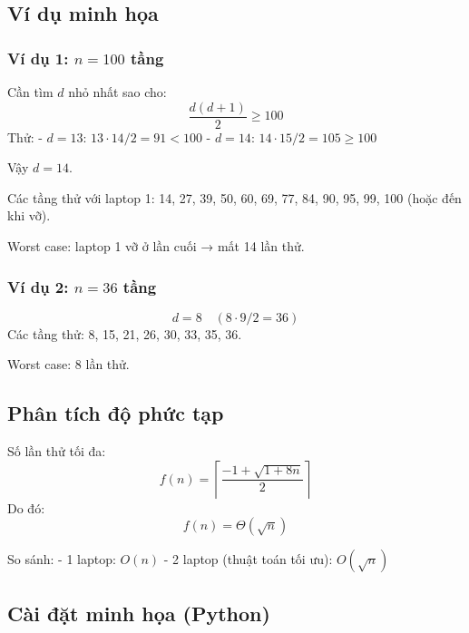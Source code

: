 \documentclass{article}
\begin{document}
\subsection{Ví dụ minh họa}

\subsubsection{Ví dụ 1: \(n = 100\) tầng}

Cần tìm \(d\) nhỏ nhất sao cho:
\[
\frac{d(d+1)}{2} \ge 100
\]
Thử:
- \(d = 13\): \(13\cdot14/2 = 91 < 100\)
- \(d = 14\): \(14\cdot15/2 = 105 \ge 100\)

Vậy \(d = 14\).

Các tầng thử với laptop 1: 14, 27, 39, 50, 60, 69, 77, 84, 90, 95, 99, 100 (hoặc đến khi vỡ).

Worst case: laptop 1 vỡ ở lần cuối → mất 14 lần thử.

\subsubsection{Ví dụ 2: \(n = 36\) tầng}

\[
d = 8 \quad (8\cdot9/2 = 36)
\]
Các tầng thử: 8, 15, 21, 26, 30, 33, 35, 36.

Worst case: 8 lần thử.

\subsection{Phân tích độ phức tạp}

Số lần thử tối đa:
\[
f(n) = \left\lceil \frac{-1 + \sqrt{1 + 8n}}{2} \right\rceil
\]
Do đó:
\[
f(n) = \Theta(\sqrt{n})
\]

So sánh:
- 1 laptop: \(O(n)\)
- 2 laptop (thuật toán tối ưu): \(O(\sqrt{n})\)

\subsection{Cài đặt minh họa (Python)}
\end{document}
